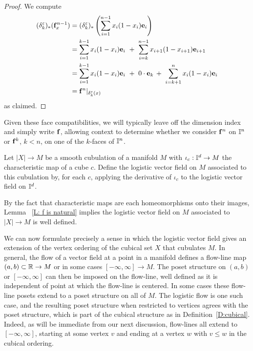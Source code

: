 \begin{proof}
	We compute 
	\begin{align*}
	(\delta_{k}^\varepsilon)_*(\mathbf{f}^{n-1}_x) & = (\delta_{k}^\varepsilon)_* \left(\sum_{i=1}^{n-1 } x_{i} (1 - x_{i}) \mathbf{e}_{i} \right) \\ & = 
	\sum_{i=1 }^{k-1} x_{i} (1 - x_{i}) \mathbf{e}_{i}\ +\
	\sum_{i=k}^{n-1} x_{i+1} (1 - x_{i+1}) \mathbf{e}_{i+1} \\ & =
	\sum_{i=1}^{k-1} x_{i} (1 - x_{i}) \mathbf{e}_{i}\ +\
	0 \cdot \mathbf{e}_k\, + \
	\sum_{i=k+1}^n x_{i} (1 - x_{i}) \mathbf{e}_{i} \\ & =
	\mathbf{f}^n|_{\delta_k^\varepsilon(x)}
	\end{align*}
	as claimed.
\end{proof}

Given these face compatibilities, we will typically leave off the dimension index and simply write $\mathbf{f}$, allowing context to determine whether we consider $\mathbf{f}^n$ on $\mathbb{I}^n$ or $\mathbf{f}^k$, $k<n$, on one of the $k$-faces of $\mathbb{I}^n$.

\begin{definition}
Let $ |X| \to M$ be a smooth cubulation of a manifold $M$ with $\iota_c : \mathbb{I}^d \to M$  the characteristic map of a cube $c$.
 Define the logistic vector field on $M$ associated to this cubulation by, for each $c$, applying the derivative
of $\iota_c$ to the logistic vector field on $\mathbb{I}^d$.  
\end{definition}

By the fact that characteristic maps are each homeomorphisms onto their  images, Lemma ~\ref{L: f is natural} implies the logistic vector field on $M$ associated to $|X| \to M$ is well defined.  

We can now formulate precisely a sense in which the logistic vector field gives an extension of the vertex ordering of the cubical set $X$ that cubulates $M$.
In general, the flow of a vector field at a point in a manifold  defines a flow-line map $(a,b) \subset \mathbb{R} \to M$ or in some cases $[-\infty, \infty] \to M$.  
The poset structure on $(a,b)$ or 
$[-\infty, \infty]$ can then be imposed on the flow-line, well defined as it is independent of point at which the flow-line is centered.
In some cases these flow-line posets extend to a poset structure on all of $M$.  
The logistic flow is one such case, and the resulting poset structure when restricted to vertices agrees with  the poset structure, 
 which is part of the cubical structure as in 
Definition~\ref{D:cubical}.  Indeed, as will be immediate from our next discussion,
flow-lines all extend to $[-\infty, \infty]$, starting at some vertex $v$ and ending at a vertex $w$ with $v \leq w$ in the cubical ordering. 

